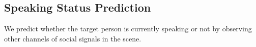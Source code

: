 






\subsection{Speaking Status Prediction}
We predict whether the target person is currently speaking or not by observing other channels of social signals in the scene.

